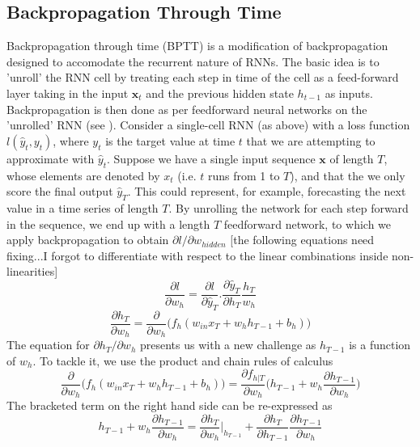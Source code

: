 \documentclass[]{article}
\begin{document}
\subsection{Backpropagation Through Time}
Backpropagation through time (BPTT) is a modification of backpropagation designed to accomodate the recurrent nature of RNNs. The basic idea is to 'unroll' the RNN cell by treating each step in time of the cell as a feed-forward layer taking in the input $\textbf{x}_{t}$ and the previous hidden state $h_{t-1}$ as inputs. Backpropagation is then done as per feedforward neural networks on the 'unrolled' RNN (see ).
\newline
\newline
Consider a single-cell RNN (as above) with a loss function $l(\hat{y}_{t}, y_{t})$, where $y_{t}$ is the target value at time $t$ that we are attempting to approximate with $\hat{y}_{t}$. Suppose we have a single input sequence $\textbf{x}$ of length $T$, whose elements are denoted by $x_{t}$ (i.e. $t$ runs from 1 to $T$), and that the we only score the final output $\hat{y}_{T}$. This could represent, for example, forecasting the next value in a time series of length $T$. By unrolling the network for each step forward in the sequence, we end up with a length $T$ feedforward network, to which we apply backpropagation to obtain $\partial l/\partial w_{hidden}$
[the following equations need fixing...I forgot to differentiate with respect to the linear combinations inside non-linearities]
\begin{equation}
\frac{\partial l}{\partial w_{h}} = \frac{\partial l}{\partial \hat{y}_{T}} . \frac{\partial \hat{y}_{T}}{\partial h_{T}} \frac{h_{T}}{w_{h}}\label{eq:3}
\end{equation}
\begin{equation}
\frac{\partial h_{T}}{\partial w_{h}} = \frac{\partial}{\partial w_{h}} \bigg(f_{h}(w_{in} x_{T} + w_{h} h_{T-1} + b_{h}) \bigg)
\end{equation}
The equation for $\partial h_{T}/ \partial w_{h}$ presents us with a new challenge as $h_{T-1}$ is a function of $w_{h}$. To tackle it, we use the product and chain rules of calculus
\begin{equation}
 \frac{\partial}{\partial w_{h}} \bigg(f_{h}(w_{in} x_{T} + w_{h} h_{T-1} + b_{h}) \bigg) = \frac{\partial f_{h|T}}{\partial w_{h}} \bigg( h_{T-1} + w_{h}  \frac{\partial h_{T-1}}{\partial w_{h}} \bigg)
\end{equation}
The bracketed term on the right hand side can be re-expressed as
\begin{equation}
h_{T-1} + w_{h}  \frac{\partial h_{T-1}}{\partial w_{h}} = \frac{\partial h_{T}}{\partial w_{h}} \bigg|_{h_{T-1}} + \frac{\partial h_{T}}{\partial h_{T-1}} \frac{\partial h_{T-1}}{\partial w_{h}}
\end{equation}
\end{document}
